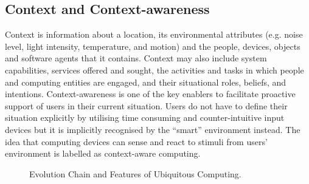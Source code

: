 \documentclass[12pt]{article} %
\begin{document}
\subsection{Context and Context-awareness} %

Context is information about a location, its environmental attributes (e.g. noise level, light intensity, temperature, and motion) and the people, devices, objects and software agents that it contains. Context may also include system capabilities, services offered and sought, the activities and tasks in which people and computing entities are engaged, and their situational roles, beliefs, and intentions. Context-awareness is one of the key enablers to facilitate proactive support of users in their current situation. Users do not have to define their situation explicitly by utilising time consuming and counter-intuitive input devices but it is implicitly recognised by the “smart” environment instead. The idea that computing devices can sense and react to stimuli from users’ environment is labelled as context-aware computing.

\begin{figure}[H]
\caption{Evolution Chain and Features of Ubiquitous Computing.}
\label{fig:speciation}
\end{figure}




 

\end{document}
